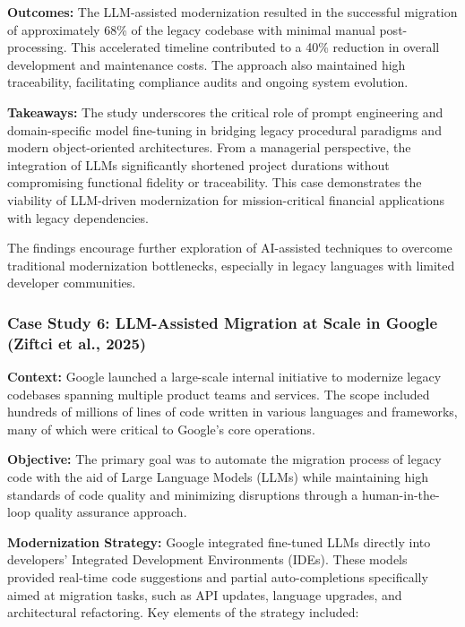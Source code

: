 \documentclass[12pt]{article}
\begin{document}
\textbf{Outcomes:}  
The LLM-assisted modernization resulted in the successful migration of approximately 68\% of the legacy codebase with minimal manual post-processing. This accelerated timeline contributed to a 40\% reduction in overall development and maintenance costs. The approach also maintained high traceability, facilitating compliance audits and ongoing system evolution.

\textbf{Takeaways:}  
The study underscores the critical role of prompt engineering and domain-specific model fine-tuning in bridging legacy procedural paradigms and modern object-oriented architectures. From a managerial perspective, the integration of LLMs significantly shortened project durations without compromising functional fidelity or traceability. This case demonstrates the viability of LLM-driven modernization for mission-critical financial applications with legacy dependencies.

The findings encourage further exploration of AI-assisted techniques to overcome traditional modernization bottlenecks, especially in legacy languages with limited developer communities.


\vspace{0.5cm}

\subsubsection{Case Study 6: LLM-Assisted Migration at Scale in Google (Ziftci et al., 2025)}

\textbf{Context:}  
Google launched a large-scale internal initiative to modernize legacy codebases spanning multiple product teams and services. The scope included hundreds of millions of lines of code written in various languages and frameworks, many of which were critical to Google's core operations.

\textbf{Objective:}  
The primary goal was to automate the migration process of legacy code with the aid of Large Language Models (LLMs) while maintaining high standards of code quality and minimizing disruptions through a human-in-the-loop quality assurance approach.

\textbf{Modernization Strategy:}  
Google integrated fine-tuned LLMs directly into developers' Integrated Development Environments (IDEs). These models provided real-time code suggestions and partial auto-completions specifically aimed at migration tasks, such as API updates, language upgrades, and architectural refactoring. Key elements of the strategy included:
\end{document}
